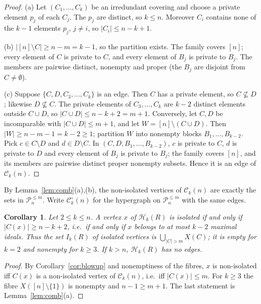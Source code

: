 \documentclass{amsart}
\newtheorem{corollary}[theorem]{Corollary}
\theoremstyle{definition}
\theoremstyle{remark}
\newcommand{\cC}{\mathcal{C}}
\newcommand{\cP}{\mathcal{P}}
\newcommand{\cH}{\mathcal{H}}
\newcommand{\nn}{[n]}
\begin{document}
\begin{proof}
(a) Let $(C_1,\dots,C_k)$ be an irredundant covering and choose a private element $p_j$ of each $C_j$. The $p_j$ are distinct, so $k\le n$. Moreover $C_i$ contains none of the $k-1$ elements $p_j$, $j\ne i$, so $|C_i|\le n-k+1$.

(b) $|\nn\setminus C|\ge n-m=k-1$, so the partition exists. The family covers $\nn$; every element of $C$ is private to $C$, and every element of $B_j$ is private to $B_j$. The members are pairwise distinct, nonempty and proper (the $B_j$ are disjoint from $C\neq\emptyset$).

(c) Suppose $\{C,D,C_3,\dots,C_k\}$ is an edge. Then $C$ has a private element, so $C\not\subseteq D$; likewise $D\not\subseteq C$. The private elements of $C_3,\dots,C_k$ are $k-2$ distinct elements outside $C\cup D$, so $|C\cup D|\le n-k+2=m+1$.
Conversely, let $C,D$ be incomparable with $|C\cup D|\le m+1$, and let $W=\nn\setminus(C\cup D)$. Then $|W|\ge n-m-1=k-2\ge 1$; partition $W$ into nonempty blocks $B_1,\dots,B_{k-2}$. Pick $c\in C\setminus D$ and $d\in D\setminus C$. In $(C,D,B_1,\dots,B_{k-2})$, $c$ is private to $C$, $d$ is private to $D$ and every element of $B_j$ is private to $B_j$; the family covers $\nn$, and its members are pairwise distinct proper nonempty subsets. Hence it is an edge of $\cC_k(n)$.
\end{proof}

By Lemma~\ref{lem:comb}(a),(b), the non-isolated vertices of $\cC_k(n)$ are exactly the sets in $\cP_n^{\le m}$. Write $\cC_k^{\circ}(n)$ for the hypergraph on $\cP_n^{\le m}$ with the same edges.

\begin{corollary}\label{cor:isolated}
Let $2\le k\le n$. A vertex $x$ of $\cH_k(R)$ is isolated if and only if $|C(x)|\ge n-k+2$, i.e.\ if and only if $x$ belongs to at most $k-2$ maximal ideals. Thus the set $I_k(R)$ of isolated vertices is $\bigcup_{|C|>m}X(C)$; it is empty for $k=2$ and nonempty for $k\ge3$. If $k>n$, $\cH_k(R)$ has no edges.
\end{corollary}

\begin{proof}
By Corollary~\ref{cor:blowup} and nonemptiness of the fibres, $x$ is non-isolated iff $C(x)$ is a non-isolated vertex of $\cC_k(n)$, i.e.\ iff $|C(x)|\le m$. For $k\ge 3$ the fibre $X(\nn\setminus\{1\})$ is nonempty and $n-1\ge m+1$. The last statement is Lemma~\ref{lem:comb}(a).
\end{proof}
\end{document}

